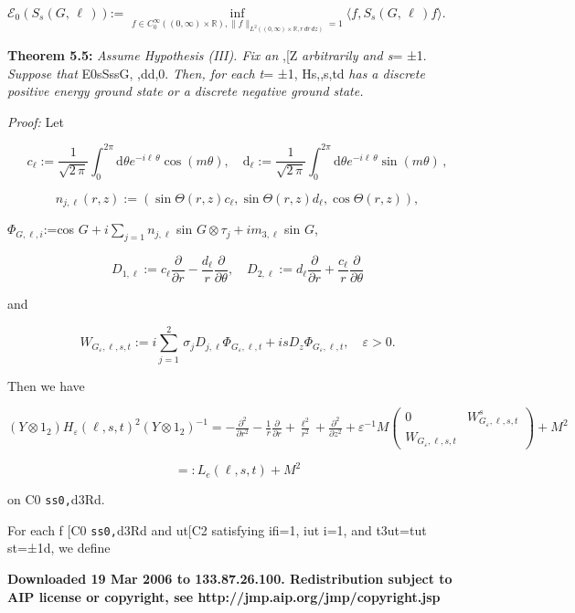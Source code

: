 \documentclass{article}
\begin{document}
$\mathcal{E}_{0}(S_{s}(G,\,\ell\,))$:= $\inf\limits_{f\in C_{0}^{\infty}((0,\infty)\times\mathbb{R}),\|f\|_{L^{2}((0,\infty)\times\mathbb{R},r\,dr\,dz)}=1}\langle f,S_{s}(G,\,\ell\,)f\rangle$.

\textbf{Theorem 5.5:} \textit{Assume Hypothesis (III). Fix an} ,[Z \textit{arbitrarily and s}= ±1. \textit{Suppose that} E0sSssG, ,dd,0. \textit{Then, for each t}= ±1, Hs,,s,td \textit{has a discrete positive energy ground state or a discrete negative ground state.}

\textit{Proof:} Let

$$c_{\ell}:=\frac{1}{\sqrt{2\,\pi}}\int_{0}^{2\pi}\mathrm{d}\theta e^{-i\ell\,\theta}\cos(m\theta),\quad\mathrm{d}_{\ell}:=\frac{1}{\sqrt{2\,\pi}}\int_{0}^{2\pi}\mathrm{d}\theta e^{-i\ell\,\theta}\sin(m\theta)\,,$$

$$n_{j,\ell}(r,z):=(\sin\Theta(r,z)c_{\ell},\sin\Theta(r,z)d_{\ell},\cos\Theta(r,z)),$$

$\Phi_{G,\ell,i}$:=cos $G+i\sum_{j=1}n_{j,\ell}$ sin $G\otimes\tau_{j}+im_{3,\ell}$ sin $G$,

$$D_{1,\ell}:=c_{\ell}\frac{\partial}{\partial r}-\frac{d_{\ell}}{r}\frac{\partial}{\partial\theta},\quad D_{2,\ell}:=d_{\ell}\frac{\partial}{\partial r}+\frac{c_{\ell}}{r}\frac{\partial}{\partial\theta}$$

and

$$W_{G_{\varepsilon},\ell,s,t}:=i\sum_{j=1}^{2}\,\sigma_{j}D_{j,\ell}\Phi_{G_{\varepsilon},\ell,t}+i s D_{z}\Phi_{G_{\varepsilon},\ell,t},\quad\varepsilon>0.$$

Then we have

$(Y\otimes1_{2})H_{\varepsilon}(\ell,s,t)^{2}(Y\otimes1_{2})^{-1}=-\frac{\partial^{2}}{\partial r^{2}}-\frac{1}{r}\frac{\partial}{\partial r}+\frac{\ell^{2}}{r^{2}}+\frac{\partial^{2}}{\partial z^{2}}+\varepsilon^{-1}M\!\left(\begin{array}{cc}0&W^{s}_{G_{\varepsilon},\ell,s,t}\\ W_{G_{\varepsilon},\ell,s,t}\end{array}\right)+M^{2}$

$$=:L_{e}(\ell,s,t)+M^{2}$$

on C0 \verb|ss0,|d3Rd.

For each f [C0 \verb|ss0,|d3Rd and ut[C2 satisfying ifi=1, iut i=1, and t3ut=tut st=±1d, we define

\textbf{Downloaded 19 Mar 2006 to 133.87.26.100. Redistribution subject to AIP license or copyright, see http://jmp.aip.org/jmp/copyright.jsp}
\end{document}
